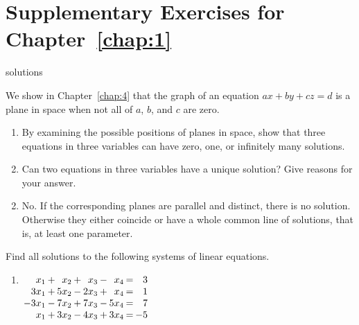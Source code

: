 \section*{Supplementary Exercises for Chapter~\ref{chap:1}}

\begin{Filesave}{solutions}
\end{Filesave}

\begin{multicols}{2}
\begin{supex}
We show in Chapter~\ref{chap:4} that the graph of an equation $ax + by + cz = d$ is a plane in space when not all of $a$, $b$, and $c$ are zero.

\begin{enumerate}[label={\alph*.}]
\item By examining the possible positions of planes in space, show that three equations in three variables can have zero, one, or infinitely many solutions.

\item Can two equations in three variables have a unique solution? Give reasons for your answer.

\end{enumerate}
\begin{supsol}
\begin{enumerate}[label={\alph*.}]
\setcounter{enumi}{1}
\item 
 No. If the corresponding planes are parallel and distinct, there is no 
solution. Otherwise they either coincide or have a whole common line of 
solutions, that is, at least one parameter.

\end{enumerate}
\end{supsol}
\end{supex}

\begin{supex}
Find all solutions to the following systems of linear equations.

\begin{enumerate}[label={\alph*.}]
\item 
$\arraycolsep=1pt
\begin{array}[t]{rlrlrlrcr}
	  x_1 & + &  x_2 & + &  x_3 & - &  x_4 & = &  3 \\
	 3x_1 & + & 5x_2 & - & 2x_3 & + &  x_4 & = &  1 \\
	-3x_1 & - & 7x_2 & + & 7x_3 & - & 5x_4 & = &  7 \\
	  x_1 & + & 3x_2 & - & 4x_3 & + & 3x_4 & = & -5 \\
\end{array}$


\end{enumerate}
\end{supex}
\end{multicols}
